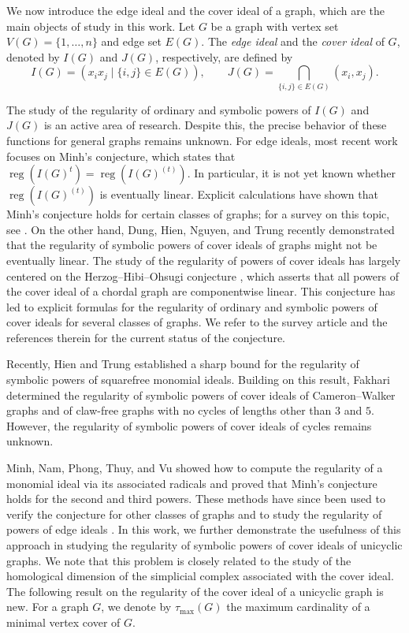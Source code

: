 \documentclass[12pt,amscd]{amsart}
\theoremstyle{definition}
\DeclareMathOperator{\reg}{reg}
\begin{document}
We now introduce the edge ideal and the cover ideal of a graph, which are the main objects of study in this work. Let $G$ be a graph with vertex set $V(G) = \{1, \ldots, n\}$ and edge set $E(G)$. The \textit{edge ideal} and the \textit{cover ideal} of $G$, denoted by $I(G)$ and $J(G)$, respectively, 
are defined by
\[
I(G) = (x_i x_j \mid \{i,j\} \in E(G)), 
\qquad 
J(G) = \bigcap_{\{i,j\} \in E(G)} (x_i, x_j).
\]

The study of the regularity of ordinary and symbolic powers of $I(G)$ and $J(G)$ is an active area of research. Despite this, the precise behavior of these functions for general graphs remains unknown. For edge ideals, most recent work focuses on Minh's conjecture, which states that $\reg(I(G)^t) = \reg(I(G)^{(t)})$. In particular, it is not yet known whether $\reg(I(G)^{(t)})$ is eventually linear. Explicit calculations have shown that Minh's conjecture holds for certain classes of graphs; for a survey on this topic, see \cite{MV1}. On the other hand, Dung, Hien, Nguyen, and Trung \cite{DHNT} recently demonstrated that the regularity of symbolic powers of cover ideals of graphs 
might not be eventually linear. The study of the regularity of powers of cover ideals has largely centered on the Herzog--Hibi--Ohsugi conjecture \cite{HHO}, which asserts that all powers of the cover ideal of a chordal graph are componentwise linear. This conjecture has led to explicit formulas for the regularity of ordinary and symbolic powers of cover ideals for several classes of graphs. We refer to the survey article \cite{HT} and the references therein for the current status of the conjecture.

Recently, Hien and Trung \cite{HiT} established a sharp bound for the regularity of symbolic powers of squarefree monomial ideals. Building on this result, Fakhari \cite{F3} determined the regularity of symbolic powers of cover ideals of Cameron--Walker graphs and of claw-free graphs with no cycles of lengths other than $3$ and $5$. However, the regularity of symbolic powers of cover ideals of cycles remains unknown.

Minh, Nam, Phong, Thuy, and Vu \cite{MNPTV} showed how to compute the regularity of a monomial ideal via its associated radicals and proved that Minh's conjecture holds for the second and third powers. These methods have since been used to verify the conjecture for other classes of graphs and to study the regularity of powers of edge ideals \cite{MV2}. In this work, we further demonstrate the usefulness of this approach in studying the regularity of symbolic powers of cover ideals of unicyclic graphs. We note that this problem is closely related to the study of the homological dimension of the simplicial complex associated with the cover ideal. The following result on the regularity of the cover ideal of a unicyclic graph is new. For a graph $G$, we denote by $\tau_{\max}(G)$ the maximum cardinality of a minimal vertex cover of $G$.
\end{document}
